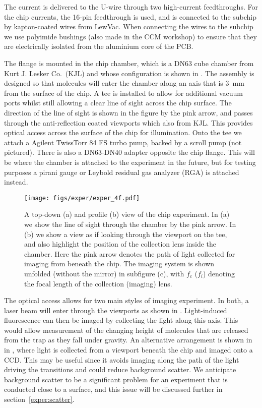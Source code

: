 The current is delivered to the U-wire through two high-current feedthroughs.
For the chip currents, the 16-pin feedthrough is used, and is connected to the
subchip by kapton-coated wires from LewVac. When connecting the wires to the
subchip we use polyimide bushings (also made in the CCM workshop) to ensure
that they are electrically isolated from the aluminium core of the PCB.

The flange is mounted in the chip chamber, which is a DN63 cube chamber from
Kurt J.  Lesker Co.\ (KJL) and whose configuration is shown in
.  The assembly is designed so that molecules will
enter the chamber along an axis that is \SI{3}{\milli\meter} from the surface
of the chip. A tee is installed to allow for additional vacuum ports whilst
still allowing a clear line of sight across the chip surface. The direction of
the line of sight is shown in the figure by the pink arrow, and passes through
the anti-reflection coated viewports which also from KJL. This provides optical
access across the surface of the chip for illumination.  Onto the tee we attach
a Agilent TwissTorr 84 FS turbo pump, backed by a scroll pump (not pictured).
There is also a DN63-DN40 adapter opposite the chip flange. This will be where
the chamber is attached to the \CaF{} experiment in the future, but for testing
purposes a pirani gauge or Leybold residual gas analyzer (RGA) is attached
instead.

\begin{figure}
  \centering
  \texttt{[image: figs/exper/exper\_4f.pdf]}
  \caption[Chip chamber testing setup]{
  A top-down (a) and profile (b) view of the chip experiment. In (a)
  we show the line of sight through the chamber by the pink arrow. In (b) we
  show a view as if looking through the viewport on the tee, and also highlight
  the position of the collection lens inside the chamber. Here the
  pink arrow denotes the path of light collected for imaging from beneath the
  chip. The imaging system is shown unfolded (without the mirror) in subfigure
  (c), with $f_c$ ($f_i$) denoting the focal length of the collection (imaging)
  lens.}
  \label{exper:fig:exper}
\end{figure}

The optical access allows for two main styles of imaging experiment. In both, a
laser beam will enter through the viewports as shown in
. Light-induced fluorescence can then be imaged
by collecting the light along this axis. This would allow measurement of the
changing height of molecules that are released from the trap as they fall under
gravity. 
%
An alternative arrangement is shown in in ,
where light is collected from a viewport beneath the chip and imaged onto a
CCD. This may be useful since it avoids imaging along the path of the light
driving the transitions and could reduce background scatter. We anticipate
background scatter to be a significant problem for an experiment that is
conducted close to a surface, and this issue will be discussed further in
section~\ref{exper:scatter}.

